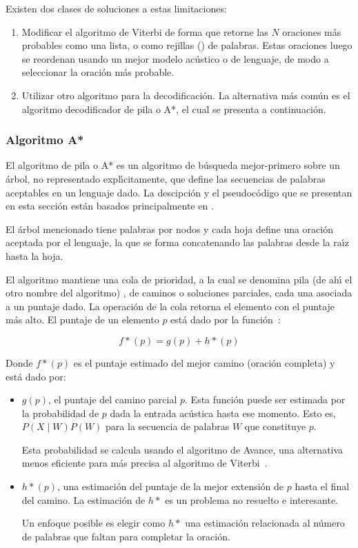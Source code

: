 Existen dos clases de soluciones a estas limitaciones:
\begin{enumerate}
	\item Modificar el algoritmo de Viterbi de forma que retorne las $N$ oraciones m\'as probables como una lista, o como 
	rejillas () de palabras. Estas oraciones luego se reordenan usando un mejor modelo ac\'ustico o de lenguaje,
	de modo a seleccionar la oraci\'on m\'as probable.
	\item Utilizar otro algoritmo para la decodificaci\'on. La alternativa m\'as com\'un es el algoritmo decodificador de pila o A*, el cual
	se presenta a continuaci\'on.
\end{enumerate}

\subsubsection{Algoritmo A*}
El algoritmo de pila o A* es un algoritmo de b\'usqueda mejor-primero sobre un \'arbol, no representado expl{\'\i}citamente, que define las
secuencias de palabras aceptables en un lenguaje dado. La descipci\'on y el pseudoc\'odigo que se presentan en esta secci\'on
est\'an basados principalmente en \cite{Jurafsky, PaulEfficient1992}.

El \'arbol mencionado tiene palabras por nodos y cada hoja define una oraci\'on aceptada por el lenguaje, la que se forma concatenando las 
palabras desde la ra{\'\i}z hasta la hoja.  

El algoritmo mantiene una cola de prioridad, a la cual se denomina pila (de ah{\'\i} el otro nombre del algoritmo) \cite{PostStack}, 
de caminos o soluciones parciales, cada una asociada a un puntaje dado. La operaci\'on  de la cola retorna el elemento 
con el puntaje m\'as alto. El puntaje de un elemento $p$ est\'a dado por la \mbox{funci\'on \cite{Jurafsky, Russell2003Solving}}:

\begin{equation*}
	f*(p) = g(p) + h*(p)
\end{equation*}

Donde $f*(p)$ es el puntaje estimado del mejor camino (oraci\'on completa) y est\'a dado por:

\begin{itemize}
 	\item $g(p)$, el puntaje del camino parcial $p$. Esta funci\'on puede ser estimada por la probabilidad de $p$ dada la entrada ac\'ustica
 	hasta ese momento. Esto es, $P(X \mid W)P(W)$ para la secuencia de palabras $W$ que constituye $p$. 

 	Esta probabilidad se calcula usando el algoritmo de Avance, una alternativa menos eficiente para m\'as precisa al algoritmo de 
 	\mbox{Viterbi \cite{Jurafsky}}.

 	\item $h*(p)$, una estimaci\'on del puntaje de la mejor extensi\'on de $p$ hasta el final del camino. La estimaci\'on de $h*$ es un problema
 	no resuelto e interesante. 

 	Un enfoque posible es elegir como $h*$ una estimaci\'on relacionada al n\'umero de palabras que faltan para
 	completar la oraci\'on.
 \end{itemize}


